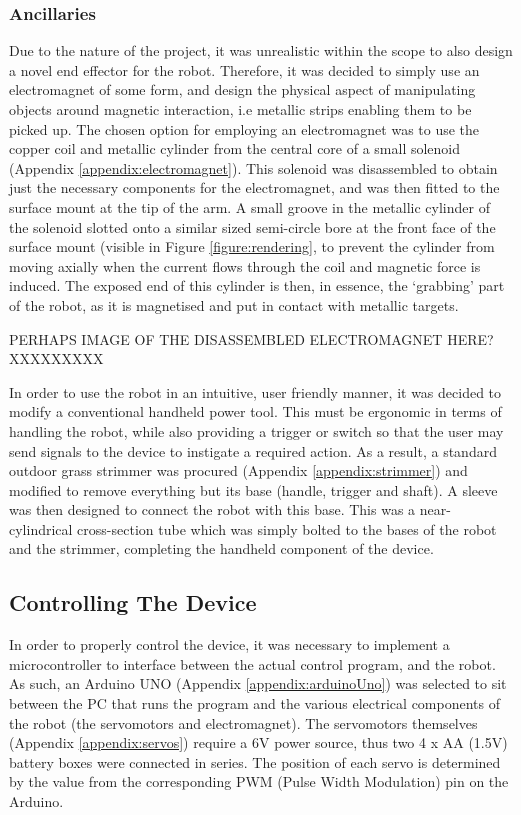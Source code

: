 \documentclass[11pt]{article}
\begin{document}
\subsubsection{Ancillaries}
Due to the nature of the project, it was unrealistic within the scope to also design a novel end effector for the robot. Therefore, it was decided to simply use an electromagnet of some form, and design the physical aspect of manipulating objects around magnetic interaction, i.e metallic strips enabling them to be picked up. The chosen option for employing an electromagnet was to use the copper coil and metallic cylinder from the central core of a small solenoid (Appendix \ref{appendix:electromagnet}). This solenoid was disassembled to obtain just the necessary components for the electromagnet, and was then fitted to the surface mount at the tip of the arm. A small groove in the metallic cylinder of the solenoid slotted onto a similar sized semi-circle bore at the front face of the surface mount (visible in Figure \ref{figure:rendering}, to prevent the cylinder from moving axially when the current flows through the coil and magnetic force is induced. The exposed end of this cylinder is then, in essence, the `grabbing' part of the robot, as it is magnetised and put in contact with metallic targets.

PERHAPS IMAGE OF THE DISASSEMBLED ELECTROMAGNET HERE? XXXXXXXXX

In order to use the robot in an intuitive, user friendly manner, it was decided to modify a conventional handheld power tool. This must be ergonomic in terms of handling the robot, while also providing a trigger or switch so that the user may send signals to the device to instigate a required action. As a result, a standard outdoor grass strimmer was procured (Appendix \ref{appendix:strimmer}) and modified to remove everything but its base (handle, trigger and shaft). A sleeve was then designed to connect the robot with this base. This was a near-cylindrical cross-section tube which was simply bolted to the bases of the robot and the strimmer, completing the handheld component of the device.


\pagebreak
\subsection{Controlling The Device}
\label{section:controllingTheDevice}

In order to properly control the device, it was necessary to implement a microcontroller to interface between the actual control program, and the robot. As such, an Arduino UNO (Appendix \ref{appendix:arduinoUno}) was selected to sit between the PC that runs the program and the various electrical components of the robot (the servomotors and electromagnet). The servomotors themselves (Appendix \ref{appendix:servos}) require a 6V power source, thus two 4 x AA (1.5V) battery boxes were connected in series. The position of each servo is determined by the value from the corresponding PWM (Pulse Width Modulation) pin on the Arduino. 
\end{document}
